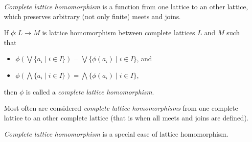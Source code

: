 \documentclass[12pt]{article}
\begin{document}
\emph{Complete lattice homomorphism} is a function from one lattice to an other lattice, which preserves arbitrary (not only finite) meets and joins.

If $\phi:L \to M$ is lattice homomorphism between complete lattices $L$ and $M$ such that
\begin{itemize}
\item
$\phi(\bigvee \lbrace a_i\mid i\in I\rbrace) = \bigvee \lbrace \phi(a_i)\mid
i\in I\rbrace$, and
\item
$\phi(\bigwedge \lbrace a_i\mid i\in I\rbrace) = \bigwedge \lbrace
\phi(a_i)\mid i\in I\rbrace$,
\end{itemize}
then $\phi$ is called a \emph{complete lattice homomorphism}.

Most often are considered \emph{complete lattice homomorphisms} from one complete lattice to an other complete lattice (that is when all meets and joins are defined).

\emph{Complete lattice homomorphism} is a special case of lattice homomorphism.
\end{document}
